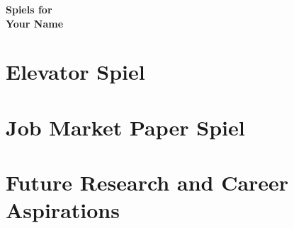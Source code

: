 \documentclass[11pt]{article}
\begin{document}
\begin{center}
{\Large {\bf Spiels for }}
\\[5pt]
{\large {\bf Your Name}}
\end{center}

\vspace{.3cm}

\section{\large Elevator Spiel} %

\section{\large Job Market Paper Spiel} %

\section{\large Future Research and Career Aspirations} %
\end{document}
